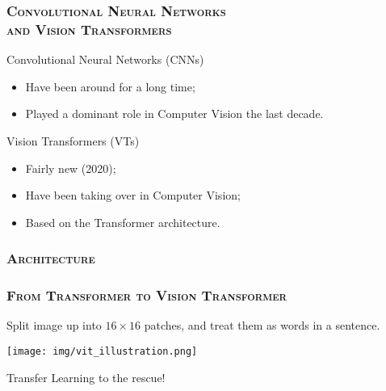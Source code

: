 \documentclass{beamer}
\newcommand{\createtitle}[1]{\frametitle{\textsc{\bfseries#1}}}
\begin{document}
\begin{frame}
\createtitle{Convolutional Neural Networks\\and Vision Transformers}

\pause
Convolutional Neural Networks (CNNs)
\begin{itemize}
\item Have been around for a long time;
\item Played a dominant role in Computer Vision the last decade.
\end{itemize}

\pause
Vision Transformers (VTs)
\begin{itemize}
\item Fairly new (2020);
\item Have been taking over in Computer Vision;
\item Based on the Transformer architecture.
\end{itemize}

\end{frame}

\begin{frame}
\createtitle{Architecture}


\end{frame}

\begin{frame}
\createtitle{From Transformer to Vision Transformer}

Split image up into $16 \times 16$ patches, and treat them as words in a sentence.
\vspace{0.5cm}

\texttt{[image: img/vit\_illustration.png]}

\pause
\vspace{0.5cm}
Transfer Learning to the rescue!

\end{frame}
\end{document}
